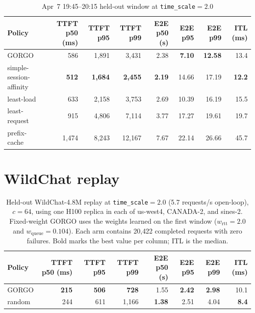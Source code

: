 \documentclass{article}
\begin{document}
\begin{table}[h]
\centering
\small
\setlength{\tabcolsep}{2.7pt}
\caption{Apr~7 19:45--20:15 held-out window at \texttt{time\_scale}${=}2.0$}
\label{tab:apr7_ts2}
\begin{tabular}{lrrrrrrr}
\toprule
Policy & TTFT p50 (ms) & TTFT p95 & TTFT p99 & E2E p50 (s) & E2E p95 & E2E p99 & ITL (ms) \\
\midrule
GORGO                   & 586          & 1{,}891          & 3{,}431          & 2.38          & \textbf{7.10}  & \textbf{12.58} & 13.4 \\
simple-session-affinity & \textbf{512} & \textbf{1{,}684} & \textbf{2{,}455} & \textbf{2.19} & 14.66          & 17.19          & \textbf{12.2} \\
least-load              & 633          & 2{,}158          & 3{,}753          & 2.69          & 10.39          & 16.19          & 15.5 \\
least-request           & 915          & 4{,}806          & 7{,}114          & 3.77          & 17.27          & 19.61          & 19.7 \\
prefix-cache            & 1{,}474      & 8{,}243          & 12{,}167         & 7.67          & 22.14          & 26.66          & 45.7 \\
\bottomrule
\end{tabular}
\end{table}

\section{WildChat replay}
\label{app:wildchat}

\begin{table}[htbp]
\centering
\small
\caption{Held-out WildChat-4.8M replay at \texttt{time\_scale}${=}2.0$
(5.7 requests/s open-loop), $c{=}64$, using one H100 replica in each of
us-west4, CANADA-2, and sines-2. Fixed-weight GORGO uses the weights learned on
the first window ($w_{\mathrm{rtt}}{=}2.0$ and
$w_{\mathrm{queue}}{=}0.104$). Each arm contains 20{,}422 completed requests
with zero failures. Bold marks the best value per column; ITL is the median.}
\label{tab:wildchat}
\setlength{\tabcolsep}{2.7pt}
\begin{tabular}{lrrrrrrr}
\toprule
Policy & TTFT p50 (ms) & TTFT p95 & TTFT p99 & E2E p50 (s) & E2E p95 & E2E p99 & ITL (ms) \\
\midrule
GORGO  & \textbf{215} & \textbf{506} & \textbf{728}   & 1.55          & \textbf{2.42} & \textbf{2.98} & 10.1 \\
random & 244          & 611          & 1{,}166         & \textbf{1.38} & 2.51          & 4.04          & \textbf{8.4} \\
\bottomrule
\end{tabular}
\end{table}
\end{document}
